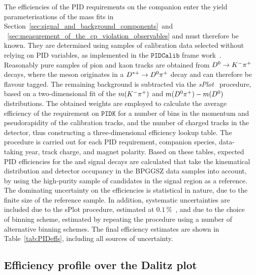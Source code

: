 The efficiencies of the PID requirements on the companion enter the yield parameterisations of the mass fits in Section~\ref{sec:signal_and_background_components}~and ~\ref{sec:measurement_of_the_cp_violation_observables} and must therefore be known. They are determined using samples of calibration data selected without relying on PID variables, as implemented in the $\texttt{PIDCalib}$ frame work~\cite{anderliniPIDCalibPackage2016}. Reasonably pure samples of pion and kaon tracks are obtained from ${{D}^0}\rightarrow{\ensuremath{{K}^-}}{\ensuremath{{\pi}^+}}$ decays, where the \D meson originates in a ${{D}^{*+}}\rightarrow{\ensuremath{{D}^0}}{\ensuremath{{\pi}^+}}$ decay and can therefore be flavour tagged. The remaining background is subtracted via the \emph{sPlot}~\cite{sPlot} procedure, based on a two-dimensional fit of the $m({{K}^-}{{\pi}^+})$ and $m({{D}^0}{{\pi}^+})-m({{D}^0})$ distributions. The obtained weights are employed to calculate the average efficiency of the requirement on $\texttt{PIDK}$ for a number of bins in the momentum and pseudorapidity of the calibration tracks, and the number of charged tracks in the detector, thus constructing a three-dimensional efficiency lookup table. The procedure is carried out for each PID requirement, companion species, data-taking year, track charge, and magnet polarity. Based on these tables, expected PID efficiencies for the \BtoDpi and \BtoDK signal decays are calculated that take the kinematical distribution and detector occupancy in the BPGGSZ data samples into account, by using the high-purity sample of \BtoDpi candidates in the signal region as a reference. The dominating uncertainty on the efficiencies is statistical in nature, due to the finite size of the reference sample. In addition, systematic uncertainties are included due to the sPlot procedure, estimated at $0.1\,\%$~\cite{anderliniPIDCalibPackage2016}, and due to the choice of binning scheme, estimated by repeating the procedure using a number of alternative binning schemes. The final efficiency estimates are shown in Table~\ref{tab:PIDeffs}, including all sources of uncertainty.




\subsection{Efficiency profile over the Dalitz plot} %
\label{sub:efficiency_profile_over_the_dalitz_plot}




